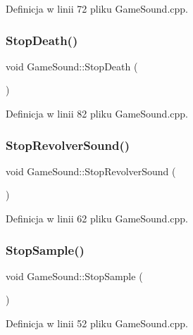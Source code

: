 Definicja w linii 72 pliku Game\+Sound.\+cpp.

\mbox{\label{class_game_sound_accb7034b9c796bc9270fc3a724d18821}} 
\subsubsection{\texorpdfstring{Stop\+Death()}{StopDeath()}}
{\footnotesize\ttfamily void Game\+Sound\+::\+Stop\+Death (\begin{DoxyParamCaption}{ }\end{DoxyParamCaption})}



Definicja w linii 82 pliku Game\+Sound.\+cpp.

\mbox{\label{class_game_sound_a88651691b6b8e28f14e73778805bd898}} 
\subsubsection{\texorpdfstring{Stop\+Revolver\+Sound()}{StopRevolverSound()}}
{\footnotesize\ttfamily void Game\+Sound\+::\+Stop\+Revolver\+Sound (\begin{DoxyParamCaption}{ }\end{DoxyParamCaption})}



Definicja w linii 62 pliku Game\+Sound.\+cpp.

\mbox{\label{class_game_sound_a819246ab2ca8154f7b8fa1b87cdd68ca}} 
\subsubsection{\texorpdfstring{Stop\+Sample()}{StopSample()}}
{\footnotesize\ttfamily void Game\+Sound\+::\+Stop\+Sample (\begin{DoxyParamCaption}{ }\end{DoxyParamCaption})}



Definicja w linii 52 pliku Game\+Sound.\+cpp.

